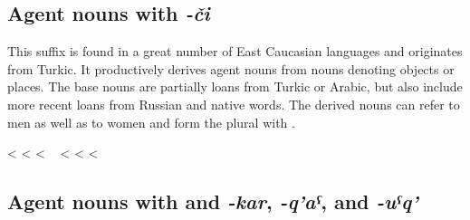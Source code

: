 
\subsection{Agent nouns with \textit{-či}}
\label{subsection:Agent nouns with -či}

This suffix is found in a great number of East Caucasian languages and originates from Turkic. It productively derives agent nouns from nouns denoting objects or places. The base nouns are partially loans from Turkic or Arabic, but also include more recent loans from Russian and native words. The derived nouns can refer to men as well as to women and form the plural with .
%
\begin{exe}
	\ex	\label{masqaranjoke}
	\begin{xlist}
		\TabPositions{14em,16em}
		\ex	{} 		\tab	<	\tab	{} 
		\ex	{} 			\tab	<	\tab	{} 
		\ex	{} 			\tab	<	\tab	{} 		
		\ex	{} 
		\sn	~\hspace*{1em}						\tab	<	\tab	{} 
		\ex	{} 				\tab	<	\tab	{} 
		\ex	{} 		\tab	<	\tab	{} 
	\end{xlist}
\end{exe}



\subsection{Agent nouns with and \textit{-kar}, \textit{-q'aˁ}, and \textit{-uˁq'}}
\label{ssec:Agent nouns with -q'aˁ, -uˁq' and -kar}


